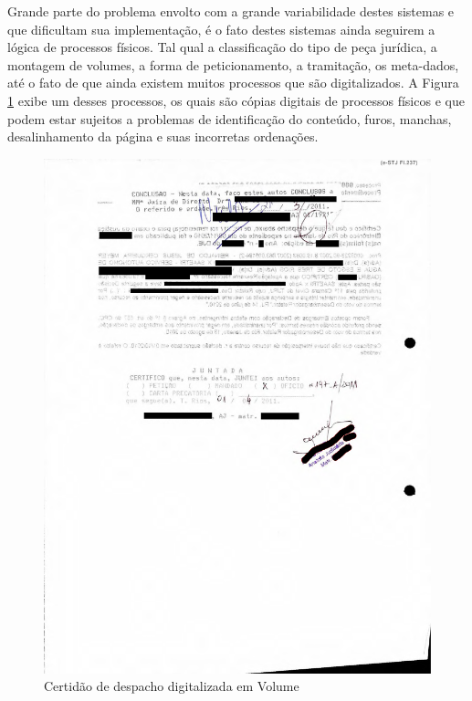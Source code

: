 Grande parte do problema envolto com a grande variabilidade destes sistemas e que dificultam sua implementação, é o fato destes sistemas ainda seguirem a lógica de processos físicos. Tal qual a classificação do tipo de peça jurídica, a montagem de volumes, a forma de peticionamento, a tramitação, os meta-dados, até o fato de que ainda existem muitos processos que são digitalizados. A Figura \ref{fig:bad_scan} exibe um desses processos, os quais são cópias digitais de processos físicos e que podem estar sujeitos a problemas de identificação do conteúdo, furos, manchas, desalinhamento da página e suas incorretas ordenações.

\begin{figure}[!ht]
	\centering
	\label{fig:bad_scan}
		\includegraphics[keepaspectratio=true,scale=0.3]{figuras/badScan}
	\caption{Certidão de despacho digitalizada em Volume}
\end{figure}

